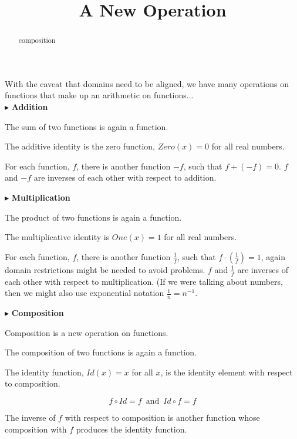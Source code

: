 \documentclass{ximera}
\title{A New Operation}
\begin{document}
\begin{abstract}
composition
\end{abstract}
\maketitle





With the caveat that domains need to be aligned, we have many operations on functions that make up an arithmetic on functions... \\




$\blacktriangleright$ \textbf{\textcolor{blue!75!black}{Addition}}  

The sum of two functions is again a function. 

The additive identity is the zero function, $Zero(x) = 0$ for all real numbers.

For each function, $f$, there is another function $-f$, such that $f + (-f) = 0$.   $f$ and $-f$ are inverses of each other with respect to addition.




$\blacktriangleright$ \textbf{\textcolor{blue!75!black}{Multiplication}} 

The product of two functions is again a function.  

The multiplicative identity is $One(x) = 1$ for all real numbers.

For each function, $f$, there is another function $\frac{1}{f}$, such that $f \cdot \left( \frac{1}{f} \right) = 1$, again domain restrictions might be needed to avoid problems.   $f$ and $\frac{1}{f}$ are inverses of each other with respect to multiplication.  (If we were talking about numbers, then we might also use exponential notation $\frac{1}{n} = n^{-1}$.


$\blacktriangleright$ \textbf{\textcolor{blue!75!black}{Composition}} 

Composition is a new operation on functions.

The composition of two functions is again a function. 

The identity function, $Id(x) = x$ for all $x$, is the identity element with respect to composition.



\[   f \circ Id = f    \, \text{ and } \, Id \circ f = f        \]



The inverse of $f$ with respect to composition is another function whose composition with $f$ produces the identity function.
\end{document}

